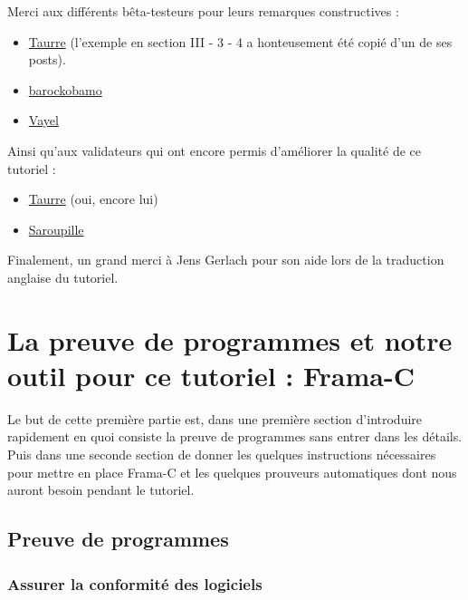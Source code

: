 \documentclass[12pt,francais,]{scrbook}
\newenvironment{zdsblock}[1]{%
  \tcolorbox[beamer,%
    noparskip,breakable,
    colback=LightBlue,colframe=DarkBlue,%
    colbacklower=DarkBlue,%
    title=#1]
}{\endtcolorbox}
\begin{document}
\begin{zdsblock}{Information}
  Merci aux différents bêta-testeurs
  pour leurs remarques constructives :
  \begin{itemize}
  \item \href{https://zestedesavoir.com/membres/voir/Taurre/}{Taurre} (l'exemple
    en section III - 3 - 4 a honteusement été copié d'un de ses
    posts).
  \item \href{https://zestedesavoir.com/membres/voir/barockobamo/}{barockobamo}
  \item \href{https://zestedesavoir.com/membres/voir/Vayel/}{Vayel}
  \end{itemize}
   Ainsi qu'aux validateurs qui ont encore permis
   d'améliorer la qualité de ce tutoriel :
   \begin{itemize}
   \item \href{https://zestedesavoir.com/membres/voir/Taurre/}{Taurre} (oui,
     encore lui)
   \item \href{https://zestedesavoir.com/membres/voir/Saroupille/}{Saroupille}
   \end{itemize}
   Finalement, un grand merci à Jens Gerlach pour son aide lors de la traduction
   anglaise du tutoriel.

\end{zdsblock}

\chapter{La preuve de programmes et notre outil pour ce tutoriel :
Frama-C}\label{la-preuve-de-programmes-et-notre-outil-pour-ce-tutoriel-frama-c}

Le but de cette première partie est, dans une première section
d'introduire rapidement en quoi consiste la preuve de programmes sans
entrer dans les détails. Puis dans une seconde section de donner les
quelques instructions nécessaires pour mettre en place Frama-C et les
quelques prouveurs automatiques dont nous auront besoin pendant le
tutoriel.

\section{Preuve de programmes}\label{preuve-de-programmes}

\subsection{Assurer la conformité des
logiciels}\label{assurer-la-conformituxe9-des-logiciels}
\end{document}
